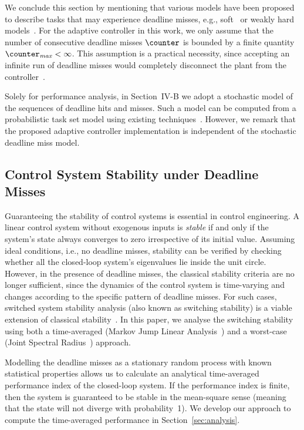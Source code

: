 We conclude this section by mentioning that various models have been proposed to describe tasks
that may experience deadline misses, e.g., soft~\cite{Marchand:2008} or weakly hard models~\cite{Bernat:2001, hammadeh:2017}.
For the adaptive controller in this work, we only assume that the number of consecutive deadline misses $\counter$ is bounded by a finite quantity $\counter_\mathit{max} < \infty$.
This assumption is a practical necessity, since accepting an infinite run of deadline misses would completely disconnect the plant from the controller~\cite{Maggio:2020}.

Solely for performance analysis, in Section~IV-B we adopt a stochastic model of the sequences of deadline hits and misses. 
Such a model can be computed from a probabilistic task set model using existing techniques~\cite{Chen:2017, Chen:2018, markovic:2021}. 
However, we remark that the proposed adaptive controller implementation is independent of the stochastic deadline miss model.

\subsection{Control System Stability under Deadline Misses}
\label{sec:stability}
Guaranteeing the stability of control systems is essential in control engineering.
A linear control system without exogenous inputs is \emph{stable} if and only if the system's state always converges to zero irrespective of its initial value.
Assuming ideal conditions, i.e., no deadline misses, stability can be verified by checking whether all the closed-loop system's eigenvalues lie inside the unit circle.
However, in the presence of deadline misses, the classical stability criteria are no longer sufficient, since the dynamics of the control system is time-varying and changes according to the specific pattern of deadline misses.
For such cases, switched system stability analysis (also known as switching stability) is a viable extension of classical stability~\cite{Liberzon:2003}.
In this paper, we analyse the switching stability using both a time-averaged (Markov Jump Linear Analysis~\cite{Fang:2002}) and a worst-case (Joint Spectral Radius~\cite{Rota:1960}) approach.

Modelling the deadline misses as a stationary random process with known statistical properties allows us to calculate an analytical time-averaged performance index of the closed-loop system.
If the performance index is finite, then the system is guaranteed to be stable in the mean-square sense (meaning that the state will not diverge with probability~1).
We develop our approach to compute the time-averaged performance in Section~\ref{sec:analysis}.

